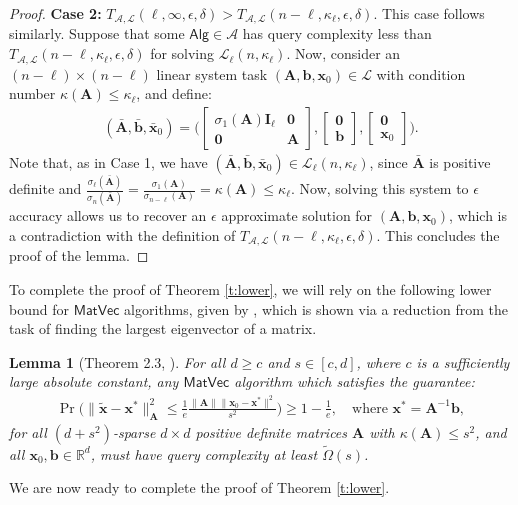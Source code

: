 \documentclass[11pt]{article}
\def\x{{\mathbf x}}
\def\Alg{{\mathsf{Alg}}}
\def\MatVec{{\mathsf{MatVec}}}
\def\b{{\mathbf b}}
\def\A{{\mathbf A}}
\def\Ac{{\mathcal A}}
\def\Lc{{\mathcal L}}
\def\I{{\mathbf I}}
\def\zero{{\mathbf 0}}
\def\R{{\mathbf R}}
\def\R{{\mathds R}}
\newtheorem{lem}[thm]{Lemma}
\begin{document}
\begin{proof}
\noindent
\textbf{Case 2:} $T_{\Ac,\Lc}(\ell,\infty,\epsilon,\delta) > T_{\Ac,\Lc}(n-\ell,\kappa_\ell,\epsilon,\delta)$. This case follows similarly. Suppose that some $\Alg\in\Ac$ has query complexity less than $T_{\Ac,\Lc}(n-\ell,\kappa_\ell,\epsilon,\delta)$ for solving $\Lc_\ell(n,\kappa_\ell)$. Now, consider an $(n-\ell)\times  (n-\ell)$ linear system task $(\A,\b,\x_0)\in\Lc$ with condition number $\kappa(\A)\leq \kappa_\ell$, and define:
\begin{align*}
(\bar\A,\bar\b,\bar\x_0)=\bigg(\begin{bmatrix}
    \sigma_1(\A)\I_{\ell}&\zero\\
    \zero& \A
\end{bmatrix}, 
\begin{bmatrix}
    \zero\\ 
    \b
\end{bmatrix},
\begin{bmatrix}
    \zero\\ 
    \x_0
\end{bmatrix}
\bigg).
\end{align*}
Note that, as in Case 1, we have $(\bar\A,\bar\b,\bar\x_0)\in\Lc_\ell(n,\kappa_\ell)$, since $\bar\A$ is positive definite and $\frac{\sigma_{\ell}(\bar\A)}{\sigma_n(\bar\A)} = \frac{\sigma_1(\A)}{\sigma_{n-\ell}(\A)}= \kappa(\A)\leq \kappa_\ell$. Now, solving this system to $\epsilon$ accuracy allows us to recover an $\epsilon$ approximate solution for $(\A,\b,\x_0)$, which is a contradiction with the definition of $T_{\Ac,\Lc}(n-\ell,\kappa_\ell,\epsilon,\delta)$. This concludes the proof of the lemma.
\end{proof}
To complete the proof of Theorem \ref{t:lower}, we will rely on the following lower bound for $\MatVec$ algorithms, given by \cite{braverman2020gradient}, which is shown via a reduction from the task of finding the largest eigenvector of a matrix.
\begin{lem}[Theorem 2.3, \cite{braverman2020gradient}]\label{l:braverman2020}
  For all $d\geq c$ and $s\in[c,d]$, where $c$ is a sufficiently large absolute constant, any $\MatVec$ algorithm which satisfies the guarantee:
  \begin{align*}
    \Pr\bigg(\|\tilde\x - \x^*\|_{\A}^2\leq \frac1e \frac{\|\A\|\|\x_0-\x^*\|^2}{s^2}\bigg)\geq 1-\frac1e,
    \quad\text{where }\x^* = \A^{-1}\b,
  \end{align*}
  for all $(d+s^2)$-sparse $d\times d$ positive definite matrices $\A$ with $\kappa(\A)\leq s^2$, and all $\x_0,\b\in\R^d$, must have query complexity at least $\tilde\Omega(s)$.
\end{lem}
\noindent
We are now ready to complete the proof of Theorem \ref{t:lower}.
\end{document}
